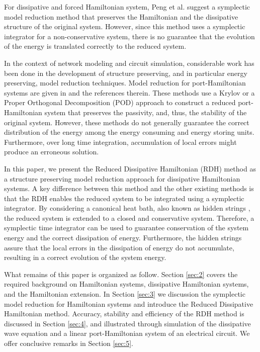For dissipative and forced Hamiltonian system, Peng et al. \cite{peng2016geometric} suggest a symplectic model reduction method that preserves the Hamiltonian and the dissipative structure of the original system. However, since this method uses a symplectic integrator for a non-conservative system, there is no guarantee that the evolution of the energy is translated correctly to the reduced system.

In the context of network modeling and circuit simulation, considerable work has been done in the development of structure preserving, and in particular energy preserving, model reduction techniques. Model reduction for port-Hamiltonian systems are given in \cite{Polyuga:2010gj,beattie2011structure,chaturantabut2016structure} and the references therein. These methods use a Krylov or a Proper Orthogonal Decomposition (POD) approach to construct a reduced port-Hamiltonian system that preserves the passivity, and, thus, the stability of the original system. However, these methods do not generally guarantee the correct distribution of the energy among the energy consuming and energy storing units. Furthermore, over long time integration, accumulation of local errors might produce an erroneous solution.

In this paper, we present the Reduced Dissipative Hamiltonian (RDH) method as a structure preserving model reduction approach for dissipative Hamiltonian systems. A key difference between this method and the other existing methods is that the RDH enables the reduced system to be integrated using a symplectic integrator. By considering a canonical heat bath, also known as hidden strings \cite{Figotin:2006jy,Figotin:2005}, the reduced system is extended to a closed and conservative system. Therefore, a symplectic time integrator can be used to guarantee conservation of the system energy and the correct dissipation of energy. Furthermore, the hidden strings assure that the local errors in the dissipation of energy do not accumulate, resulting in a correct evolution of the system energy.  

What remains of this paper is organized as follow. Section \ref{sec:2} covers the required background on Hamiltonian systems, dissipative Hamiltonian systems, and the Hamiltonian extension. In Section \ref{sec:3} we discussion the symplectic model reduction for Hamiltonian systems and introduce the Reduced Dissipative Hamiltonian method. Accuracy, stability and efficiency of the RDH method is discussed in Section \ref{sec:4}, and illustrated through simulation of the dissipative wave equation and a linear port-Hamiltonian system of an electrical circuit. We offer conclusive remarks in Section \ref{sec:5}.
